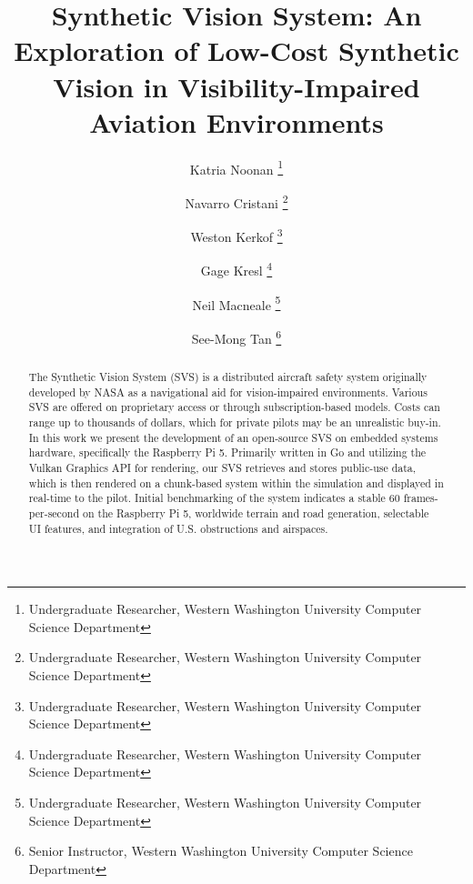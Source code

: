 \documentclass[journal ]{new-aiaa}
\title{Synthetic Vision System: An Exploration of Low-Cost Synthetic Vision in Visibility-Impaired Aviation Environments}
\author{Katria Noonan \footnote{Undergraduate Researcher, Western Washington University Computer Science Department}}
\author{Navarro Cristani \footnote{Undergraduate Researcher, Western Washington University Computer Science Department}}
\author{Weston Kerkof \footnote{Undergraduate Researcher, Western Washington University Computer Science Department}}
\author{Gage Kresl \footnote{Undergraduate Researcher, Western Washington University Computer Science Department}}
\author{Neil Macneale \footnote{Undergraduate Researcher, Western Washington University Computer Science Department}}
\affil{Western Washington University, Bellingham, Washington, 98225}
\author{See-Mong Tan \footnote{Senior Instructor, Western Washington University Computer Science Department}}
\affil{Western Washington University, Bellingham, Washington, 98225}
\begin{document}
\maketitle

\begin{abstract}
The Synthetic Vision System (SVS) is a distributed aircraft safety system originally developed by NASA as a navigational aid for vision-impaired environments. Various SVS are offered on proprietary access or through subscription-based models. Costs can range up to thousands of dollars, which for private pilots may be an unrealistic buy-in. In this work we present the development of an open-source SVS on embedded systems hardware, specifically the Raspberry Pi 5. Primarily written in Go and utilizing the Vulkan Graphics API for rendering, our SVS retrieves and stores public-use data, which is then rendered on a chunk-based system within the simulation and displayed in real-time to the pilot. Initial benchmarking of the system indicates a stable 60 frames-per-second on the Raspberry Pi 5, worldwide terrain and road generation, selectable UI features, and integration of U.S. obstructions and airspaces.
\end{abstract}
\end{document}
